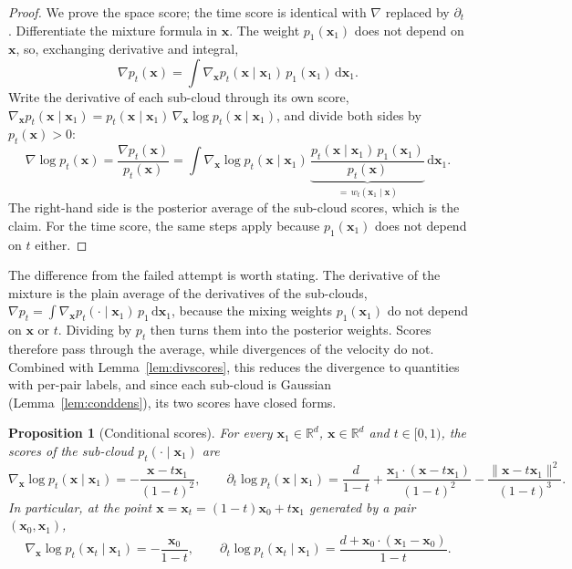 \documentclass[11pt,a4paper]{article}
\numberwithin{equation}{section}     %
\theoremstyle{plain}        %
\newtheorem{proposition}[theorem]{Proposition}
\theoremstyle{definition}   %
\theoremstyle{remark}       %
\begin{document}
\begin{proof}
We prove the space score; the time score is identical with $\nabla$ replaced by $\partial_t$. Differentiate the mixture formula in $\mathbf{x}$. The weight $p_1(\mathbf{x}_1)$ does not depend on $\mathbf{x}$, so, exchanging derivative and integral,
\[
\nabla p_t(\mathbf{x})=\int\nabla_{\mathbf{x}}p_t(\mathbf{x}\mid\mathbf{x}_1)\,p_1(\mathbf{x}_1)\,\mathrm{d}\mathbf{x}_1 .
\]
Write the derivative of each sub-cloud through its own score, $\nabla_{\mathbf{x}}p_t(\mathbf{x}\mid\mathbf{x}_1)=p_t(\mathbf{x}\mid\mathbf{x}_1)\,\nabla_{\mathbf{x}}\log p_t(\mathbf{x}\mid\mathbf{x}_1)$, and divide both sides by $p_t(\mathbf{x})>0$:
\[
\nabla\log p_t(\mathbf{x})=\frac{\nabla p_t(\mathbf{x})}{p_t(\mathbf{x})}=\int\nabla_{\mathbf{x}}\log p_t(\mathbf{x}\mid\mathbf{x}_1)\,\underbrace{\frac{p_t(\mathbf{x}\mid\mathbf{x}_1)\,p_1(\mathbf{x}_1)}{p_t(\mathbf{x})}}_{=\,w_t(\mathbf{x}_1\mid\mathbf{x})}\,\mathrm{d}\mathbf{x}_1 .
\]
The right-hand side is the posterior average of the sub-cloud scores, which is the claim. For the time score, the same steps apply because $p_1(\mathbf{x}_1)$ does not depend on $t$ either.
\end{proof}

The difference from the failed attempt is worth stating. The derivative of the mixture is the plain average of the derivatives of the sub-clouds, $\nabla p_t=\int\nabla_{\mathbf{x}}p_t(\cdot\mid\mathbf{x}_1)\,p_1\,\mathrm{d}\mathbf{x}_1$, because the mixing weights $p_1(\mathbf{x}_1)$ do not depend on $\mathbf{x}$ or $t$. Dividing by $p_t$ then turns them into the posterior weights. Scores therefore pass through the average, while divergences of the velocity do not. Combined with Lemma~\ref{lem:divscores}, this reduces the divergence to quantities with per-pair labels, and since each sub-cloud is Gaussian (Lemma~\ref{lem:conddens}), its two scores have closed forms.

\begin{proposition}[Conditional scores]\label{prop:condscores}
For every $\mathbf{x}_1\in\mathbb{R}^d$, $\mathbf{x}\in\mathbb{R}^d$ and $t\in[0,1)$, the scores of the sub-cloud $p_t(\cdot\mid\mathbf{x}_1)$ are
\[
\nabla_{\mathbf{x}}\log p_t(\mathbf{x}\mid\mathbf{x}_1)=-\frac{\mathbf{x}-t\mathbf{x}_1}{(1-t)^2},
\qquad
\partial_t\log p_t(\mathbf{x}\mid\mathbf{x}_1)=\frac{d}{1-t}+\frac{\mathbf{x}_1\cdot(\mathbf{x}-t\mathbf{x}_1)}{(1-t)^2}-\frac{\|\mathbf{x}-t\mathbf{x}_1\|^2}{(1-t)^3}.
\]
In particular, at the point $\mathbf{x}=\mathbf{x}_t=(1-t)\mathbf{x}_0+t\mathbf{x}_1$ generated by a pair $(\mathbf{x}_0,\mathbf{x}_1)$,
\[
\nabla_{\mathbf{x}}\log p_t(\mathbf{x}_t\mid\mathbf{x}_1)=-\frac{\mathbf{x}_0}{1-t},
\qquad
\partial_t\log p_t(\mathbf{x}_t\mid\mathbf{x}_1)=\frac{d+\mathbf{x}_0\cdot(\mathbf{x}_1-\mathbf{x}_0)}{1-t}.
\]
\end{proposition}
\end{document}
